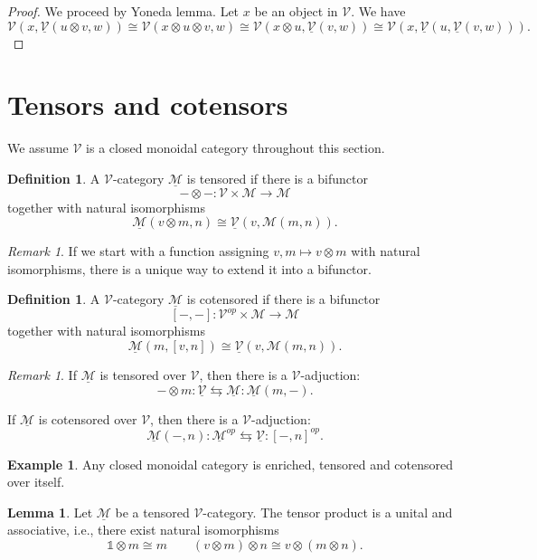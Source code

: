 \documentclass[11pt]{article}
\theoremstyle{definition}
\newtheorem{lemma}[theorem]{Lemma}
\newtheorem{definition}[theorem]{Definition}
\newtheorem{example}[theorem]{Example}
\theoremstyle{remark}
\newtheorem{remark}[theorem]{Remark}
\newcommand{\calM}{\mathcal{M}}
\newcommand{\ucalM}{\underline{\mathcal{M}}}
\newcommand{\calV}{\mathcal{V}}
\newcommand{\ucalV}{\underline{\mathcal{V}}}
\newcommand{\bbone}{\mathbb{1}}
\begin{document}
\begin{proof}
    We proceed by Yoneda lemma. Let $x$ be an object in $\calV$. We have
    \[
        \calV(x, \ucalV(u\otimes v, w)) \cong \calV(x \otimes u \otimes v, w)
            \cong \calV(x\otimes u, \ucalV(v,w)) \cong \calV(x, \ucalV(u, \ucalV(v,w))).
    \]
\end{proof}

\section{Tensors and cotensors}
We assume $\calV$ is a closed monoidal category throughout this section.  

\begin{definition}
    A $\calV$-category $\ucalM$ is tensored if there is a bifunctor
    $$-\otimes - : \calV \times \calM \to \calM$$ together with natural isomorphisms
    $$\ucalM(v\otimes m, n) \cong \ucalV(v, \calM(m,n)).$$
\end{definition}

\begin{remark}
    If we start with a function assigning $v,m \mapsto v \otimes m$ with natural isomorphisms,
    there is a unique way to extend it into a bifunctor.
\end{remark}

\begin{definition}
    A $\calV$-category $\ucalM$ is cotensored if there is a bifunctor
    $$[-,-] : \calV^{op} \times \calM \to \calM$$ together with natural isomorphisms
    $$\ucalM(m, [v,n]) \cong \ucalV(v, \calM(m,n)).$$
\end{definition}

\begin{remark}
    If $\ucalM$ is tensored over $\calV$, then there is a $\calV$-adjuction:
        $$ - \otimes m : \ucalV \leftrightarrows \ucalM : \ucalM(m,-).$$

    If $\ucalM$ is cotensored over $\calV$, then there is a $\calV$-adjuction:
        $$ \ucalM(-,n) : \ucalM^{op} \leftrightarrows \ucalV : [-,n]^{op}.$$
\end{remark}

\begin{example}
    Any closed monoidal category is enriched, tensored and cotensored over itself.
\end{example}

\begin{lemma}
    Let $\ucalM$ be a tensored $\calV$-category. The tensor product is a unital and associative,
    i.e., there exist natural isomorphisms
    $$ \bbone \otimes m \cong m \quad\quad (v\otimes m) \otimes n \cong v \otimes (m \otimes n).$$
\end{lemma}
\end{document}
